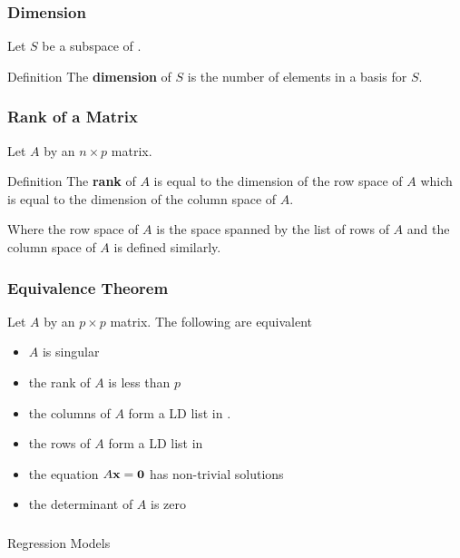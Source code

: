 \documentclass{beamer}
\begin{document}
\begin{frame}
  \frametitle{Dimension}
Let $S$ be a subspace of \RealN.
\bigskip

\begin{block}{Definition}
The \textbf{dimension} of $S$ is the number of elements in a basis for $S$.
\end{block}

\end{frame}


\begin{frame}
  \frametitle{Rank of a Matrix}
Let $A$ by an $n \times p$ matrix.
\bigskip

\begin{block}{Definition}
The \textbf{rank} of $A$ is equal to the dimension of the row space of $A$ which is equal to the dimension of the column space of $A$.
\end{block}
\bigskip
Where the row space of $A$ is the space spanned by the list of rows of $A$ and the column space of $A$ is defined similarly.

\end{frame}

\begin{frame}
  \frametitle{Equivalence Theorem}
Let $A$ by an $p \times p$ matrix. The following are equivalent
\medskip

\begin{itemize}
	\item $A$ is singular
	\item the rank of $A$ is less than $p$
	\item the columns of $A$ form a LD list in \RealN.
	\item the rows of $A$ form a LD list in \RealN
	\item the equation $A\mathbf{x} = \mathbf{0}$ has non-trivial solutions
	\item the determinant of $A$ is zero
\end{itemize}

\end{frame}


\begin{frame}
  \frametitle{}

\begin{center}
\begin{Huge}
Regression Models
\end{Huge}
\end{center}
\end{frame}
\end{document}
